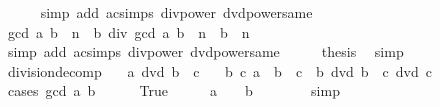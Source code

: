 \begin{isabellebody}
\ \ \ \ \isamarkupfalse%
\ {\isacharparenleft}{\kern0pt}simp\ add{\isacharcolon}{\kern0pt}\ ac{\isacharunderscore}{\kern0pt}simps\ div{\isacharunderscore}{\kern0pt}power\ dvd{\isacharunderscore}{\kern0pt}power{\isacharunderscore}{\kern0pt}same{\isacharparenright}{\kern0pt}\isanewline
\ \ \isamarkupfalse%
\ \isamarkupfalse%
\ {\isachardoublequoteopen}{\isacharparenleft}{\kern0pt}gcd\ a\ b{\isacharparenright}{\kern0pt}\ {\isacharcircum}{\kern0pt}\ n\ {\isacharasterisk}{\kern0pt}\ {\isacharparenleft}{\kern0pt}b\ div\ gcd\ a\ b{\isacharparenright}{\kern0pt}\ {\isacharcircum}{\kern0pt}\ n\ {\isacharequal}{\kern0pt}\ b\ {\isacharcircum}{\kern0pt}\ n{\isachardoublequoteclose}\isanewline
\ \ \ \ \isamarkupfalse%
\ {\isacharparenleft}{\kern0pt}simp\ add{\isacharcolon}{\kern0pt}\ ac{\isacharunderscore}{\kern0pt}simps\ div{\isacharunderscore}{\kern0pt}power\ dvd{\isacharunderscore}{\kern0pt}power{\isacharunderscore}{\kern0pt}same{\isacharparenright}{\kern0pt}\isanewline
\ \ \isamarkupfalse%
\ \isamarkupfalse%
\ {\isacharquery}{\kern0pt}thesis\ \isamarkupfalse%
\ simp\isanewline
{}\isamarkupfalse%
%
\endisatagproof
{\isafoldproof}%
%
\isadelimproof
\isanewline
%
\endisadelimproof
\isanewline
{}\isamarkupfalse%
\ division{\isacharunderscore}{\kern0pt}decomp{\isacharcolon}{\kern0pt}\isanewline
\ \ \ {\isachardoublequoteopen}a\ dvd\ b\ {\isacharasterisk}{\kern0pt}\ c{\isachardoublequoteclose}\isanewline
\ \ \ {\isachardoublequoteopen}{\isasymexists}b{\isacharprime}{\kern0pt}\ c{\isacharprime}{\kern0pt}{\isachardot}{\kern0pt}\ a\ {\isacharequal}{\kern0pt}\ b{\isacharprime}{\kern0pt}\ {\isacharasterisk}{\kern0pt}\ c{\isacharprime}{\kern0pt}\ {\isasymand}\ b{\isacharprime}{\kern0pt}\ dvd\ b\ {\isasymand}\ c{\isacharprime}{\kern0pt}\ dvd\ c{\isachardoublequoteclose}\isanewline
%
\isadelimproof
%
\endisadelimproof
%
\isatagproof
{}\isamarkupfalse%
\ {\isacharparenleft}{\kern0pt}cases\ {\isachardoublequoteopen}gcd\ a\ b\ {\isacharequal}{\kern0pt}\ {}{\isachardoublequoteclose}{\isacharparenright}{\kern0pt}\isanewline
\ \ \isamarkupfalse%
\ True\isanewline
\ \ \isamarkupfalse%
\ \isamarkupfalse%
\ {\isachardoublequoteopen}a\ {\isacharequal}{\kern0pt}\ {}\ {\isasymand}\ b\ {\isacharequal}{\kern0pt}\ {}{\isachardoublequoteclose}\isanewline
\ \ \ \ \isamarkupfalse%
\ simp\isanewline

\end{isabellebody}
